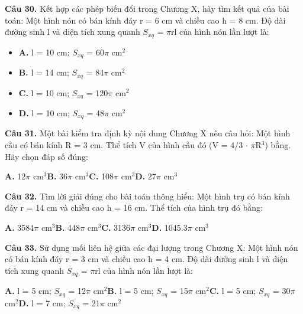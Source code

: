 \documentclass[11pt,a4paper]{article}
\begin{document}
\textbf{\color{primary} Câu 30.} Kết hợp các phép biến đổi trong Chương X, hãy tìm kết quả của bài toán: Một hình nón có bán kính đáy r = 6 cm và chiều cao h = 8 cm. Độ dài đường sinh l và diện tích xung quanh $S_{xq}$ = $\pi$rl của hình nón lần lượt là:\par
\begin{itemize}\setlength{\itemsep}{1pt}\setlength{\parskip}{0pt}
  \item[] \textbf{A.} l = 10 cm; $S_{xq}$ = 60$\pi$ cm$^2$
  \item[] \textbf{B.} l = 14 cm; $S_{xq}$ = 84$\pi$ cm$^2$
  \item[] \textbf{C.} l = 10 cm; $S_{xq}$ = 120$\pi$ cm$^2$
  \item[] \textbf{D.} l = 10 cm; $S_{xq}$ = 48$\pi$ cm$^2$
\end{itemize}\vspace{2pt}
\textbf{\color{primary} Câu 31.} Một bài kiểm tra định kỳ nội dung Chương X nêu câu hỏi: Một hình cầu có bán kính R = 3 cm. Thể tích V của hình cầu đó (V = 4/3 $\cdot$ $\pi$R$^3$) bằng. Hãy chọn đáp số đúng:\par
\hspace*{1.5em}\textbf{A.} 12$\pi$ cm$^3$\quad\quad \textbf{B.} 36$\pi$ cm$^3$\quad\quad \textbf{C.} 108$\pi$ cm$^3$\quad\quad \textbf{D.} 27$\pi$ cm$^3$\par\vspace{2pt}
\textbf{\color{primary} Câu 32.} Tìm lời giải đúng cho bài toán thông hiểu: Một hình trụ có bán kính đáy r = 14 cm và chiều cao h = 16 cm. Thể tích của hình trụ đó bằng:\par
\hspace*{1.5em}\textbf{A.} 3584$\pi$ cm$^3$\quad\quad \textbf{B.} 448$\pi$ cm$^3$\quad\quad \textbf{C.} 3136$\pi$ cm$^3$\quad\quad \textbf{D.} 1045.3$\pi$ cm$^3$\par\vspace{2pt}
\textbf{\color{primary} Câu 33.} Sử dụng mối liên hệ giữa các đại lượng trong Chương X: Một hình nón có bán kính đáy r = 3 cm và chiều cao h = 4 cm. Độ dài đường sinh l và diện tích xung quanh $S_{xq}$ = $\pi$rl của hình nón lần lượt là:\par
\hspace*{1.5em}\textbf{A.} l = 5 cm; $S_{xq}$ = 12$\pi$ cm$^2$\quad\quad \textbf{B.} l = 5 cm; $S_{xq}$ = 15$\pi$ cm$^2$\quad\quad \textbf{C.} l = 5 cm; $S_{xq}$ = 30$\pi$ cm$^2$\quad\quad \textbf{D.} l = 7 cm; $S_{xq}$ = 21$\pi$ cm$^2$\par\vspace{2pt}
\end{document}
